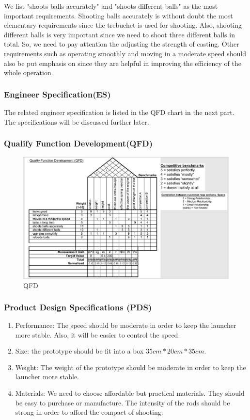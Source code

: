 \documentclass{article}
\begin{document}
We list "shoots balls accurately" and "shoots different balls" as the most important requirements. Shooting balls accurately is without doubt the most elementary requirements since the trebuchet is used for shooting. Also, shooting different balls is very important since we need to shoot three different balls in total. So, we need to pay attention the adjusting the strength of casting. Other requirements such as operating smoothly and moving in a moderate speed should also be put emphasis on since they are helpful in improving the efficiency of the whole operation.
\subsubsection{Engineer Specification(ES)}
The related engineer specification is listed in the QFD chart in the next part. The specifications will be discussed further later.
\subsubsection{Qualify Function Development(QFD)}
\begin{figure}[H]
\centering
\includegraphics[width=1\linewidth]{qfd}
\caption{QFD}
\end{figure}
\subsubsection{Product Design Specifications (PDS)}
\begin{enumerate}
\item Performance: The speed should be moderate in order to keep the launcher more stable. Also, it will be easier to control the speed.
\item Size: the prototype should be fit into a box $35cm*20cm*35cm$.
\item Weight: The weight of the prototype should be moderate in order to keep the launcher more stable.
\item Materials: We need to choose affordable but practical materials. They should be easy to purchase or manufacture. The intensity of the rods should be strong in order to afford the compact of shooting.
\end{enumerate}
\end{document}
